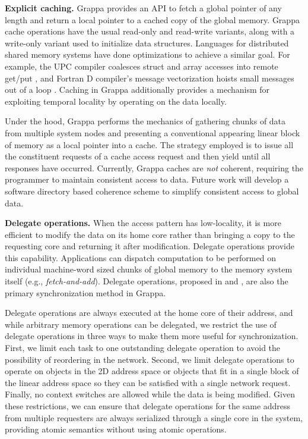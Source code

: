 \textbf{Explicit caching.} Grappa provides an API to fetch a global
pointer of any length and return a local pointer to a cached copy of the
global memory.  Grappa cache operations have the usual read-only and
read-write variants, along with a write-only variant used to initialize
data structures. Languages for distributed shared memory systems have
done optimizations to achieve a similar goal. For example, the UPC
compiler coalesces struct and array accesses into remote get/put
\cite{Chen:2005}, and Fortran D compiler's message vectorization hoists
small messages out of a loop \cite{FortranD:1992}. Caching in Grappa
additionally provides a mechanism for exploiting temporal locality by
operating on the data locally.
 
Under the hood, Grappa performs the mechanics of gathering chunks of
data from multiple system nodes and presenting a conventional appearing
linear block of memory as a local pointer into a cache. The strategy
employed is to issue all the constituent requests of a cache access
request and then yield until all responses have occurred.  Currently,
Grappa caches are \emph{not} coherent, requiring the programmer to
maintain consistent access to data.  Future work will develop a software
directory based coherence scheme to simplify consistent access to global
data.

\textbf{Delegate operations.}
When the access pattern has low-locality, it is more efficient to modify
the data on its home core rather than bringing a copy to the requesting
core and returning it after modification. Delegate operations provide
this capability. Applications can dispatch computation to be performed
on individual machine-word sized chunks of global memory to the memory
system itself (e.g., \emph{fetch-and-add}).  Delegate operations,
proposed in \cite{Nelson:hotpar11} and \cite{delegated:oopsla11}, are also the primary synchronization method in Grappa.

Delegate operations are always executed at the home core of their
address, and while arbitrary memory operations can be delegated, we
restrict the use of delegate operations in three ways to make them more
useful for synchronization. First, we limit each task to one outstanding
delegate operation to avoid the possibility of reordering in the
network. Second, we limit delegate operations to operate on objects in
the 2D address space or objects that fit in a single block of the linear
address space so they can be satisfied with a single network request.
Finally, no context switches are allowed while the data is being
modified. Given these restrictions, we can ensure that delegate
operations for the same address from multiple requesters are always
serialized through a single core in the system, providing atomic
semantics without using atomic operations.

